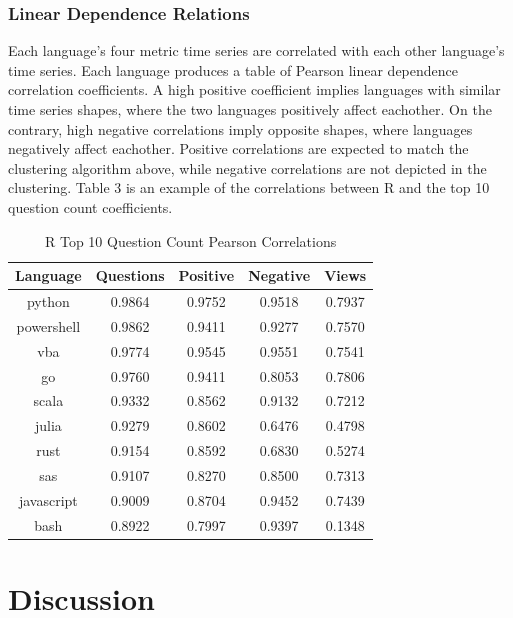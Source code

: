 \documentclass[conference]{IEEEtran}
\begin{document}
\subsubsection{Linear Dependence Relations}

Each language's four metric time series are correlated with each other language's time series. Each language produces a table of Pearson linear dependence correlation coefficients. A high positive coefficient implies languages with similar time series shapes, where the two languages positively affect eachother. On the contrary, high negative correlations imply opposite shapes, where languages negatively affect eachother. Positive correlations are expected to match the clustering algorithm above, while negative correlations are not depicted in the clustering. Table 3 is an example of the correlations between R and the top 10 question count coefficients.

\begin{table}[htbp]
\caption{R Top 10 Question Count Pearson Correlations}
\begin{center}
\begin{tabular}{|c|c|c|c|c|}
\hline
\textbf{Language} & \textbf{Questions} & \textbf{Positive} & \textbf{Negative} & \textbf{Views} \\
\hline
python &  0.9864 &  0.9752 & 0.9518 &  0.7937 \\
\hline
powershell &  0.9862 &  0.9411 & 0.9277 &  0.7570 \\
\hline
vba &  0.9774 &  0.9545 & 0.9551 &  0.7541 \\
\hline
go &  0.9760 &  0.9411 & 0.8053 &  0.7806 \\
\hline
scala &  0.9332 &  0.8562 & 0.9132 &  0.7212 \\
\hline
julia &  0.9279 &  0.8602 & 0.6476 &  0.4798 \\
\hline
rust &  0.9154 &  0.8592 & 0.6830 &  0.5274 \\
\hline
sas &  0.9107 &  0.8270 & 0.8500 &  0.7313 \\
\hline
javascript &  0.9009 &  0.8704 & 0.9452 &  0.7439 \\
\hline
bash &  0.8922 &  0.7997 & 0.9397 &  0.1348 \\
\hline
\end{tabular}
\label{tab1}
\end{center}
\end{table}

\section{Discussion}
\end{document}
